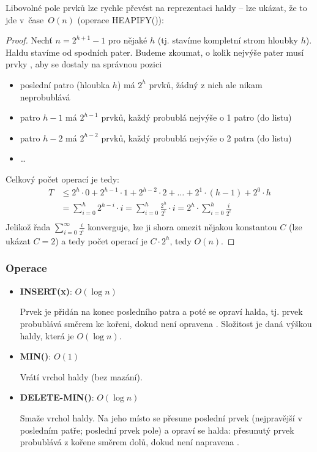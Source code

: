 \documentclass[11pt]{report} %
\numberwithin{equation}{section}
\begin{document}
Libovolné pole prvků lze rychle převést na reprezentaci haldy -- lze ukázat, že to jde v~čase~$O(n)$ (operace HEAPIFY()):
\begin{proof}
Nechť $n = 2^{h+1} - 1$ pro nějaké $h$ (tj. stavíme kompletní strom hloubky $h$). Haldu stavíme od spodních pater. Budeme zkoumat, o kolik nejvýše pater musí prvky , aby se dostaly na správnou pozici
\begin{itemize}
	
	
	\item poslední patro (hloubka $h$) má $2^h$ prvků, žádný z nich ale nikam neprobublává
	\item patro $h-1$ má $2^{h-1}$ prvků, každý probublá nejvýše o 1 patro (do listu)
	\item patro $h-2$ má $2^{h-2}$ prvků, každý probublá nejvýše o 2 patra (do listu)
	\item \dots
\end{itemize}

Celkový počet operací je tedy:
\begin{align*}
T &\leq 2^h \cdot 0 + 2^{h-1} \cdot 1 + 2^{h-2} \cdot 2 + \dots + 2^1 \cdot (h-1) + 2^0 \cdot h \\
 &=\sum\limits_{i = 0}^{h} 2^{h-i} \cdot i =\sum\limits_{i = 0}^{h} \frac{2^{h}}{2^i} \cdot i =2^h \cdot\sum\limits_{i = 0}^{h} \frac{i}{2^i}\\
\end{align*}
Jelikož řada $\sum\limits_{i = 0}^{\infty} \frac{i}{2^i}$ konverguje, lze ji shora omezit nějakou konstantou $C$ (lze ukázat $C = 2$) a tedy počet operací je $C\cdot 2^h$, tedy $O(n)$.
\end{proof}


\subsubsection{Operace}
\begin{itemize}
	
	
	\item \textbf{INSERT(x)}: $O(\log n)$
	
	 Prvek je přidán na konec posledního patra a poté se opraví halda, tj. prvek probublává směrem ke kořeni, dokud není opravena . Složitost je daná výškou haldy, která je $O(\log n)$.
	
	\item \textbf{MIN()}: $O(1)$
	
	Vrátí vrchol haldy (bez mazání).
	
	\item \textbf{DELETE-MIN()}: $O(\log n)$
	
	Smaže vrchol haldy. Na jeho místo se přesune poslední prvek (nejpravější v posledním patře; poslední prvek pole) a opraví se halda: přesunutý prvek probublává z kořene směrem dolů, dokud není napravena .	
\end{itemize}
\end{document}
